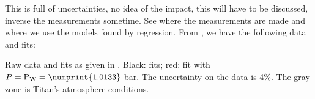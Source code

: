 
\pagebreak
\begin{remark}
This is full of uncertainties, no idea of the impact, this will have to be discussed, inverse the measurements
sometime. See where the measurements are made and where we use the models found by regression.
From \citet{Wakeham1973,Massman1998}, we have the following data and
fits:\medskip\\
\centerline{}
{Raw data and fits as given in \citet{Wakeham1973,Massman1998}.
Black: \citet{Wakeham1973} fits; red: \citet{Massman1998} fit with $P = \mathrm{P_W} = \numprint{1.0133}~$bar.
The uncertainty on the data is 4\%. The gray zone is Titan's atmosphere conditions.}
\medskip


\end{remark}
